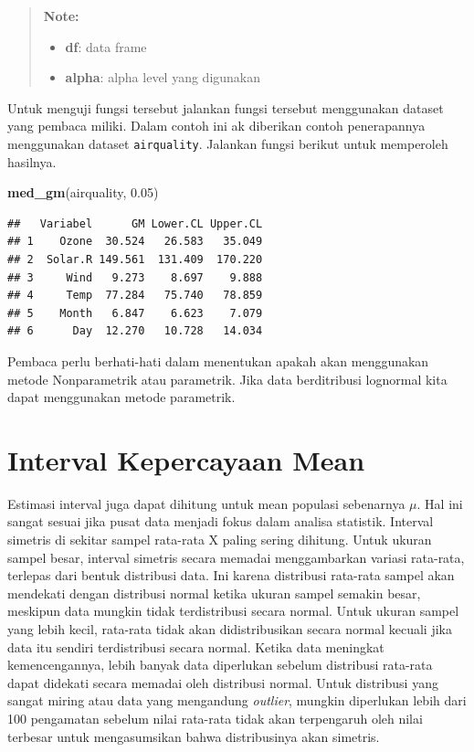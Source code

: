 \documentclass[]{book}
\newenvironment{Shaded}{\begin{snugshade}}{\end{snugshade}}
\newcommand{\KeywordTok}[1]{\textcolor[rgb]{0.13,0.29,0.53}{\textbf{#1}}}
\newcommand{\FloatTok}[1]{\textcolor[rgb]{0.00,0.00,0.81}{#1}}
\newcommand{\NormalTok}[1]{#1}
\providecommand{\tightlist}{%
  \setlength{\itemsep}{0pt}\setlength{\parskip}{0pt}}
\begin{document}
\begin{quote}
\textbf{Note: }

\begin{itemize}
\tightlist
\item
  \textbf{df}: data frame
\item
  \textbf{alpha}: alpha level yang digunakan
\end{itemize}
\end{quote}

Untuk menguji fungsi tersebut jalankan fungsi tersebut menggunakan
dataset yang pembaca miliki. Dalam contoh ini ak diberikan contoh
penerapannya menggunakan dataset \texttt{airquality}. Jalankan fungsi
berikut untuk memperoleh hasilnya.

\begin{Shaded}
\begin{Highlighting}[]
\KeywordTok{med_gm}\NormalTok{(airquality, }\FloatTok{0.05}\NormalTok{)}
\end{Highlighting}
\end{Shaded}

\begin{verbatim}
##   Variabel      GM Lower.CL Upper.CL
## 1    Ozone  30.524   26.583   35.049
## 2  Solar.R 149.561  131.409  170.220
## 3     Wind   9.273    8.697    9.888
## 4     Temp  77.284   75.740   78.859
## 5    Month   6.847    6.623    7.079
## 6      Day  12.270   10.728   14.034
\end{verbatim}

Pembaca perlu berhati-hati dalam menentukan apakah akan menggunakan
metode Nonparametrik atau parametrik. Jika data berditribusi lognormal
kita dapat menggunakan metode parametrik.

\section{Interval Kepercayaan Mean}\label{interval-kepercayaan-mean}

Estimasi interval juga dapat dihitung untuk mean populasi sebenarnya
\(\mu\). Hal ini sangat sesuai jika pusat data menjadi fokus dalam
analisa statistik. Interval simetris di sekitar sampel rata-rata X
paling sering dihitung. Untuk ukuran sampel besar, interval simetris
secara memadai menggambarkan variasi rata-rata, terlepas dari bentuk
distribusi data. Ini karena distribusi rata-rata sampel akan mendekati
dengan distribusi normal ketika ukuran sampel semakin besar, meskipun
data mungkin tidak terdistribusi secara normal. Untuk ukuran sampel yang
lebih kecil, rata-rata tidak akan didistribusikan secara normal kecuali
jika data itu sendiri terdistribusi secara normal. Ketika data meningkat
kemencengannya, lebih banyak data diperlukan sebelum distribusi
rata-rata dapat didekati secara memadai oleh distribusi normal. Untuk
distribusi yang sangat miring atau data yang mengandung \emph{outlier},
mungkin diperlukan lebih dari 100 pengamatan sebelum nilai rata-rata
tidak akan terpengaruh oleh nilai terbesar untuk mengasumsikan bahwa
distribusinya akan simetris.
\end{document}
